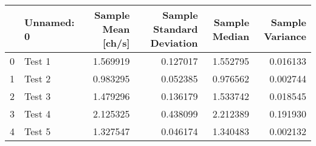 \begin{tabular}{llrrrr}
\toprule
{} & Unnamed: 0 &  Sample Mean [ch/s] &  Sample Standard Deviation &  Sample Median &  Sample Variance \\
\midrule
0 &     Test 1 &            1.569919 &                   0.127017 &       1.552795 &         0.016133 \\
1 &     Test 2 &            0.983295 &                   0.052385 &       0.976562 &         0.002744 \\
2 &     Test 3 &            1.479296 &                   0.136179 &       1.533742 &         0.018545 \\
3 &     Test 4 &            2.125325 &                   0.438099 &       2.212389 &         0.191930 \\
4 &     Test 5 &            1.327547 &                   0.046174 &       1.340483 &         0.002132 \\
\bottomrule
\end{tabular}
